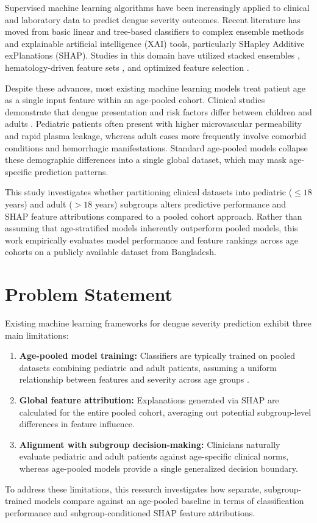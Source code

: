 \documentclass[12pt, a4paper]{report}
\begin{document}
Supervised machine learning algorithms have been increasingly applied to clinical and laboratory data to predict dengue severity outcomes. Recent literature has moved from basic linear and tree-based classifiers to complex ensemble methods and explainable artificial intelligence (XAI) tools, particularly SHapley Additive exPlanations (SHAP). Studies in this domain have utilized stacked ensembles \cite{chowdhury2022, masum2025}, hematology-driven feature sets \cite{niazi2026}, and optimized feature selection \cite{das2025}.

Despite these advances, most existing machine learning models treat patient age as a single input feature within an age-pooled cohort. Clinical studies demonstrate that dengue presentation and risk factors differ between children and adults \cite{potts2010, tanner2008}. Pediatric patients often present with higher microvascular permeability and rapid plasma leakage, whereas adult cases more frequently involve comorbid conditions and hemorrhagic manifestations. Standard age-pooled models collapse these demographic differences into a single global dataset, which may mask age-specific prediction patterns.

This study investigates whether partitioning clinical datasets into pediatric ($\le 18$ years) and adult ($> 18$ years) subgroups alters predictive performance and SHAP feature attributions compared to a pooled cohort approach. Rather than assuming that age-stratified models inherently outperform pooled models, this work empirically evaluates model performance and feature rankings across age cohorts on a publicly available dataset from Bangladesh.

\section{Problem Statement}
Existing machine learning frameworks for dengue severity prediction exhibit three main limitations:
\begin{enumerate}
    \item \textbf{Age-pooled model training:} Classifiers are typically trained on pooled datasets combining pediatric and adult patients, assuming a uniform relationship between features and severity across age groups \cite{chowdhury2022, huang2020, masum2025, tuhin2025}.
    \item \textbf{Global feature attribution:} Explanations generated via SHAP are calculated for the entire pooled cohort, averaging out potential subgroup-level differences in feature influence.
    \item \textbf{Alignment with subgroup decision-making:} Clinicians naturally evaluate pediatric and adult patients against age-specific clinical norms, whereas age-pooled models provide a single generalized decision boundary.
\end{enumerate}
To address these limitations, this research investigates how separate, subgroup-trained models compare against an age-pooled baseline in terms of classification performance and subgroup-conditioned SHAP feature attributions.
\end{document}
